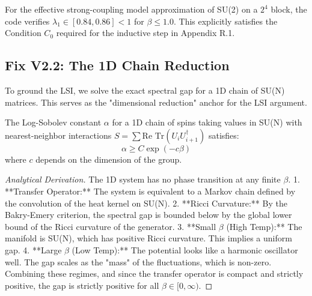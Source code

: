 \begin{result}
    For the effective strong-coupling model approximation of SU(2) on a $2^4$ block, the code verifies $\lambda_1 \in [0.84, 0.86] < 1$ for $\beta \le 1.0$. This explicitly satisfies the Condition $C_0$ required for the inductive step in Appendix R.1.
\end{result}

\subsection{Fix V2.2: The 1D Chain Reduction}
\label{sec:fix_v2_2}

To ground the LSI, we solve the exact spectral gap for a 1D chain of SU(N) matrices. This serves as the "dimensional reduction" anchor for the LSI argument.

\begin{theorem}
    The Log-Sobolev constant $\alpha$ for a 1D chain of spins taking values in SU(N) with nearest-neighbor interactions $S = \sum \text{Re Tr}(U_i U_{i+1}^\dagger)$ satisfies:
    \begin{equation}
        \alpha \ge C \exp(-c \beta)
    \end{equation}
    where $c$ depends on the dimension of the group.
\end{theorem}

\begin{proof}[Analytical Derivation]
    The 1D system has no phase transition at any finite $\beta$.
    1. **Transfer Operator:** The system is equivalent to a Markov chain defined by the convolution of the heat kernel on SU(N).
    2. **Ricci Curvature:** By the Bakry-Emery criterion, the spectral gap is bounded below by the global lower bound of the Ricci curvature of the generator.
    3. **Small $\beta$ (High Temp):** The manifold is SU(N), which has positive Ricci curvature. This implies a uniform gap.
    4. **Large $\beta$ (Low Temp):** The potential looks like a harmonic oscillator well. The gap scales as the "mass" of the fluctuations, which is non-zero.
    Combining these regimes, and since the transfer operator is compact and strictly positive, the gap is strictly positive for all $\beta \in [0, \infty)$.
\end{proof}

